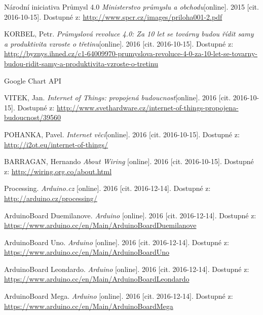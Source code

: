 \begin{literatura}{99}


 Národní iniciativa Průmysl 4.0 \textit{Ministerstvo průmyslu a obchodu}[online]. 2015 [cit. 2016-10-15]. Dostupné z: \url{http://www.spcr.cz/images/priloha001-2.pdf}

 KORBEL, Petr. \textit{Průmyslová revoluce 4.0: Za 10 let se továrny budou řídit samy a produktivita vzroste o třetinu}[online]. 2016 [cit. 2016-10-15]. Dostupné z: \url{http://byznys.ihned.cz/c1-64009970-prumyslova-revoluce-4-0-za-10-let-se-tovarny-budou-ridit-samy-a-produktivita-vzroste-o-tretinu}

 \colorbox[rgb]{1,0,0}{ Google Chart API}


 VITEK, Jan. \textit{Internet of Things: propojená budoucnost}[online]. 2016 [cit. 2016-10-15]. Dostupné z: \url{http://www.svethardware.cz/internet-of-things-propojena-budoucnost/39560}

 POHANKA, Pavel. \textit{Internet věcí}[online]. 2016 [cit. 2016-10-15]. Dostupné z: \url{http://i2ot.eu/internet-of-things/}


 BARRAGAN, Hernando \textit{About Wiring} [online]. 2016 [cit. 2016-10-15]. Dostupné z: \url{http://wiring.org.co/about.html}

 Processing. \textit{Arduino.cz} [online]. 2016 [cit. 2016-12-14]. Dostupné z: \url{http://arduino.cz/processing/}

 ArduinoBoard Duemilanove. \textit{Arduino} [online]. 2016 [cit. 2016-12-14]. Dostupné z: \url{https://www.arduino.cc/en/Main/ArduinoBoardDuemilanove}

 ArduinoBoard Uno. \textit{Arduino} [online]. 2016 [cit. 2016-12-14]. Dostupné z: \url{https://www.arduino.cc/en/Main/ArduinoBoardUno}

 ArduinoBoard Leondardo. \textit{Arduino} [online]. 2016 [cit. 2016-12-14].  Dostupné z: \url{https://www.arduino.cc/en/Main/ArduinoBoardLeondardo}

 ArduinoBoard Mega. \textit{Arduino} [online]. 2016 [cit. 2016-12-14]. Dostupné z: \url{https://www.arduino.cc/en/Main/ArduinoBoardMega}


\end{literatura}
